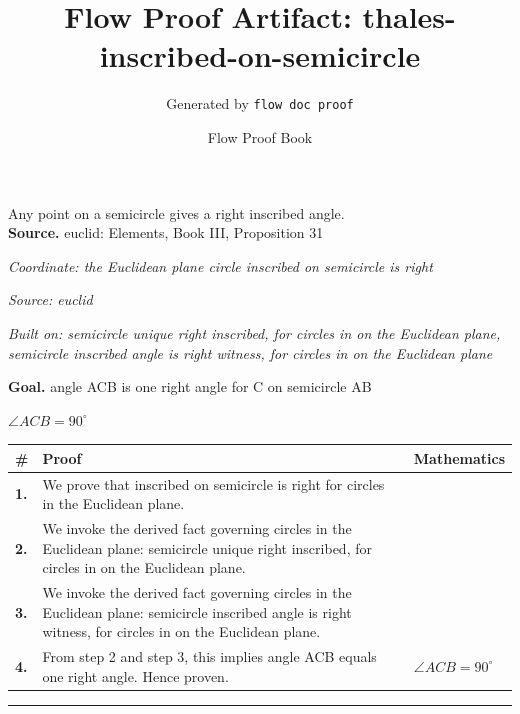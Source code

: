 \documentclass[11pt]{article}
\title{Flow Proof Artifact: thales-inscribed-on-semicircle}
\author{Generated by \texttt{flow doc proof}}
\date{Flow Proof Book}
\theoremstyle{definition}
\begin{document}
\maketitle
Any point on a semicircle gives a right inscribed angle.\\[0.5em]
\textbf{Source.} euclid: Elements, Book III, Proposition 31\\[0.5em]
\bigskip
{}\par
\smallskip\noindent\textit{Coordinate: the Euclidean plane \cdot circle \cdot inscribed on semicircle is right}\par
\smallskip\noindent\textit{Source: euclid}\par
\smallskip\noindent\textit{Built on: semicircle unique right inscribed, for circles in on the Euclidean plane, semicircle inscribed angle is right witness, for circles in on the Euclidean plane}\par
\medskip
\noindent\textbf{Goal.} angle ACB is one right angle for C on semicircle AB\par
\noindent$\displaystyle \angle ACB = 90^\circ$\par
\medskip
\noindent
\begin{tabular}{@{} >{\raggedright\arraybackslash}p{} >{\raggedright\arraybackslash}p{} >{\raggedleft\arraybackslash}p{} @{}}
\textbf{\#} & \textbf{Proof} & \textbf{Mathematics} \\
\midrule
\textbf{1.} & We prove that inscribed on semicircle is right for circles in the Euclidean plane. & \\[0.45em]
\textbf{2.} & We invoke the derived fact governing circles in the Euclidean plane: semicircle unique right inscribed, for circles in on the Euclidean plane. & \\[0.45em]
\textbf{3.} & We invoke the derived fact governing circles in the Euclidean plane: semicircle inscribed angle is right witness, for circles in on the Euclidean plane. & \\[0.45em]
\textbf{4.} & From step 2 and step 3, this implies angle ACB equals one right angle. Hence proven. & $\displaystyle \angle ACB = 90^\circ$ \\[0.45em]
\bottomrule
\end{tabular}
\label{thm:Geometry-circle-inscribed_on_semicircle_is_right}
\par\medskip\hrule
\end{document}
